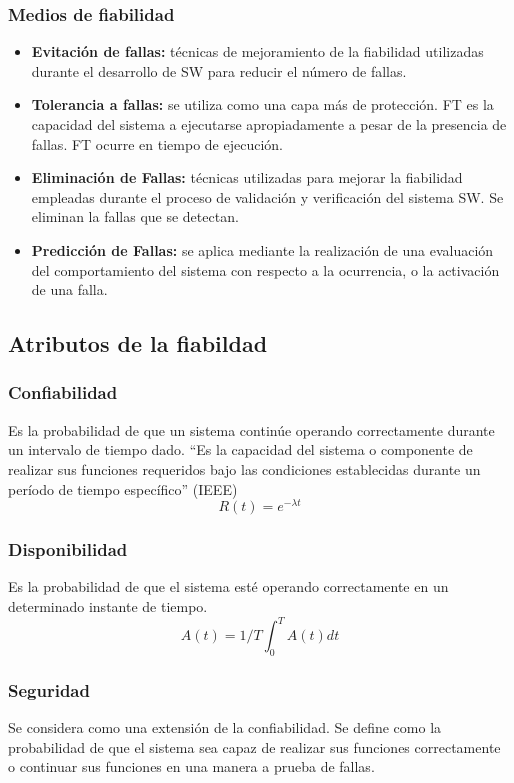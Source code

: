 \begin{frame}
	\frametitle{Medios de fiabilidad}
	\begin{itemize}
		\item \textbf{Evitación de fallas:} técnicas de mejoramiento de la fiabilidad utilizadas durante el desarrollo de SW para reducir el número de fallas.  
        \item \textbf{Tolerancia a fallas:} se utiliza como una capa más de protección. FT es la capacidad del sistema a ejecutarse apropiadamente a pesar de la presencia de fallas. FT ocurre en tiempo de ejecución.
        \item \textbf{Eliminación de Fallas:} técnicas utilizadas para mejorar la fiabilidad empleadas durante el proceso de validación y verificación del sistema SW. Se eliminan la fallas que se detectan.
        \item \textbf{Predicción de Fallas:} se aplica mediante la realización de una evaluación del comportamiento del sistema con respecto a la ocurrencia, o la activación de una falla.
	\end{itemize}
\end{frame}

\subsection{Atributos de la fiabildad}
\begin{frame}
	\frametitle{Confiabilidad}
	Es la probabilidad de que un sistema continúe operando correctamente durante un intervalo de tiempo dado. 
	“Es la capacidad del sistema o componente de realizar sus funciones requeridos bajo las condiciones establecidas durante un período de tiempo específico” (IEEE)
	\LARGE
	$$
	R(t) = e^{-\lambda t }
	$$
\end{frame}

\begin{frame}
	\frametitle{Disponibilidad}
	Es la probabilidad de que el sistema esté operando correctamente en un determinado instante de tiempo. 
	\LARGE
	$$
	A(t) = 1/T \int_0^T{A(t) dt}
	$$
\end{frame}

\begin{frame}
	\frametitle{Seguridad}
	Se considera como una extensión de la confiabilidad. Se define como la probabilidad de que el sistema sea capaz de realizar sus funciones correctamente o continuar sus funciones en una manera a prueba de fallas. 
\end{frame}


